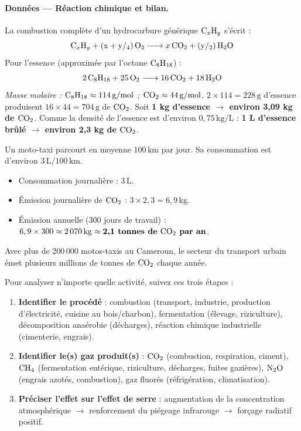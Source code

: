 \documentclass[11pt]{article}
\begin{document}
\paragraph{Données — Réaction chimique et bilan.}
La combustion complète d'un hydrocarbure générique $\ce{C_xH_y}$ s'écrit :
\[
\ce{C_xH_y + (x + y/4) O2 -> x CO2 + (y/2) H2O}
\]
Pour l'essence (approximée par l'octane $\ce{C8H18}$) :
\[
\ce{2 C8H18 + 25 O2 -> 16 CO2 + 18 H2O}
\]
\emph{Masse molaire : $\ce{C8H18} \approx 114\,\mathrm{g/mol}$ ; $\ce{CO2} \approx 44\,\mathrm{g/mol}$.}
$2 \times 114 = 228\,\mathrm{g}$ d'essence produisent $16 \times 44 = 704\,\mathrm{g}$ de $\ce{CO2}$.
Soit \textbf{1 kg d'essence $\rightarrow$ environ 3,09 kg de $\ce{CO2}$}.
Comme la densité de l'essence est d'environ $0,75\,\mathrm{kg/L}$ : \textbf{1 L d'essence brûlé $\rightarrow$ environ 2,3 kg de $\ce{CO2}$}.

\begin{exemplebox}
Un moto-taxi parcourt en moyenne $100\,\mathrm{km}$ par jour. Sa consommation est d'environ $3\,\mathrm{L/100\,km}$.
\begin{itemize}
    \item Consommation journalière : $3\,\mathrm{L}$.
    \item Émission journalière de $\ce{CO2}$ : $3 \times 2,3 = 6,9\,\mathrm{kg}$.
    \item Émission annuelle (300 jours de travail) : $6,9 \times 300 \approx 2\,070\,\mathrm{kg} \approx \textbf{2,1 tonnes de $\ce{CO2}$ par an}$.
\end{itemize}
Avec plus de 200\,000 motos-taxis au Cameroun, le secteur du transport urbain émet plusieurs millions de tonnes de $\ce{CO2}$ chaque année.
\end{exemplebox}

\begin{methode}
Pour analyser n'importe quelle activité, suivez ces trois étapes :
\begin{enumerate}
    \item \textbf{Identifier le procédé} : combustion (transport, industrie, production d'électricité, cuisine au bois/charbon), fermentation (élevage, riziculture), décomposition anaérobie (décharges), réaction chimique industrielle (cimenterie, engrais).
    \item \textbf{Identifier le(s) gaz produit(s)} : $\ce{CO2}$ (combustion, respiration, ciment), $\ce{CH4}$ (fermentation entérique, riziculture, décharges, fuites gazières), $\ce{N2O}$ (engrais azotés, combustion), gaz fluorés (réfrigération, climatisation).
    \item \textbf{Préciser l'effet sur l'effet de serre} : augmentation de la concentration atmosphérique $\rightarrow$ renforcement du piégeage infrarouge $\rightarrow$ forçage radiatif positif.
\end{enumerate}
\end{methode}
\end{document}
